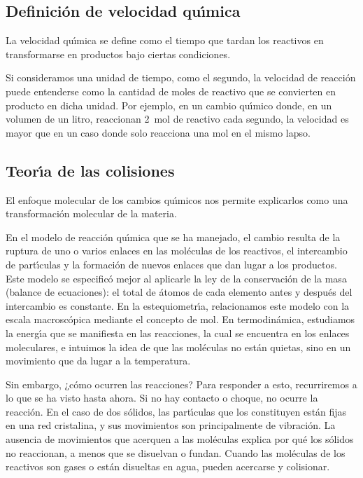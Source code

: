 \subsection{Definici\'on de velocidad qu\'{\i}mica}
La velocidad qu\'{\i}mica se define como el tiempo que tardan los reactivos en transformarse en productos bajo ciertas condiciones.

Si consideramos una unidad de tiempo, como el segundo, la velocidad de reacci\'on puede entenderse como la cantidad de moles de reactivo que se convierten en producto en dicha unidad. Por ejemplo, en un cambio qu\'{\i}mico donde, en un volumen de un litro, reaccionan \SI{2}{\mole} de reactivo cada segundo, la velocidad es mayor que en un caso donde solo reacciona una \si{\mole} en el mismo lapso.

\subsection{Teor\'{\i}a de las colisiones}
El enfoque molecular de los cambios qu\'{\i}micos nos permite explicarlos como una transformaci\'on molecular de la materia.

En el modelo de reacci\'on qu\'{\i}mica que se ha manejado, el cambio resulta de la ruptura de uno o varios enlaces en las mol\'eculas de los reactivos, el intercambio de part\'{\i}culas y la formaci\'on de nuevos enlaces que dan lugar a los productos. Este modelo se especific\'o mejor al aplicarle la ley de la conservaci\'on de la masa (balance de ecuaciones): el total de \'atomos de cada elemento antes y despu\'es del intercambio es constante. En la estequiometr\'{\i}a, relacionamos este modelo con la escala macrosc\'opica mediante el concepto de mol. En termodin\'amica, estudiamos la energ\'{\i}a que se manifiesta en las reacciones, la cual se encuentra en los enlaces moleculares, e intuimos la idea de que las mol\'eculas no est\'an quietas, sino en un movimiento que da lugar a la temperatura.

Sin embargo, ¿c\'omo ocurren las reacciones? Para responder a esto, recurriremos a lo que se ha visto hasta ahora. Si no hay contacto o choque, no ocurre la reacci\'on. En el caso de dos s\'olidos, las part\'{\i}culas que los constituyen est\'an fijas en una red cristalina, y sus movimientos son principalmente de vibraci\'on. La ausencia de movimientos que acerquen a las mol\'eculas explica por qu\'e los s\'olidos no reaccionan, a menos que se disuelvan o fundan. Cuando las mol\'eculas de los reactivos son gases o est\'an disueltas en agua, pueden acercarse y colisionar.

